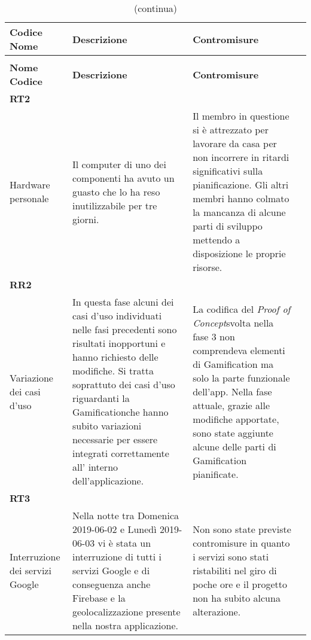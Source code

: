 \renewcommand{\arraystretch}{1.5}
\begin{longtable}{ 
		>{\centering}p{} 
		>{\raggedright}p{}
		>{\raggedright}p{} 
		>{\centering}p{}
	}
	
	
	\caption{Tabella attualizzazione rischi fase 4}\\
	\rowcolorhead
	\textbf{Codice \\ Nome} & \centering{}\textbf{Descrizione} & 
	\centering{}\textbf{Contromisure} 
	\tabularnewline
	\endfirsthead
	\rowcolor{white}\caption[]{(continua)}\\
	\rowcolorhead
	\textbf{Nome \\ Codice} & \centering{}\textbf{Descrizione} & 
	\centering{}\textbf{Contromisure} 
	\tabularnewline
	\endhead
	
	\textbf{RT2} \\ Hardware personale & 
	Il computer di uno dei componenti ha avuto un guasto che lo ha reso inutilizzabile per tre giorni. &
	Il membro in questione si è attrezzato per lavorare da casa per non incorrere in ritardi significativi sulla pianificazione. Gli altri membri hanno colmato la mancanza di alcune parti di sviluppo mettendo a disposizione le proprie risorse.
	\tabularnewline
	
	
	\textbf{RR2} \\ Variazione dei casi d'uso & 
	In questa fase alcuni dei casi d'uso individuati nelle fasi precedenti sono risultati inopportuni e hanno richiesto delle modifiche. Si tratta soprattuto dei casi d'uso riguardanti la Gamification\glosp che hanno subito variazioni necessarie per essere integrati correttamente all' interno dell'applicazione. &
	La codifica del \textit{Proof of Concept}\glosp svolta nella fase 3 non comprendeva elementi di Gamification ma solo la parte funzionale dell'app. Nella fase attuale, grazie alle modifiche apportate, sono state aggiunte alcune delle parti di Gamification pianificate.
	\tabularnewline
	
	\textbf{RT3} \\ Interruzione dei servizi Google & 
	Nella notte tra Domenica 2019-06-02 e Lunedì 2019-06-03 vi è stata un interruzione di tutti i servizi Google e di conseguenza anche Firebase e la geolocalizzazione presente nella nostra applicazione. &
	Non sono state previste contromisure in quanto i servizi sono stati ristabiliti nel giro di poche ore e il progetto non ha subito alcuna alterazione.
	\tabularnewline
	

\end{longtable}
